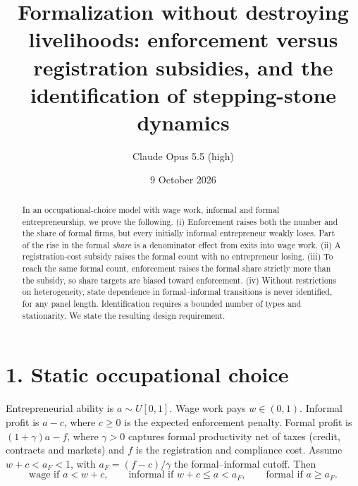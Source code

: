 \documentclass[11pt]{article}
\title{Formalization without destroying livelihoods: enforcement versus registration subsidies, and the identification of stepping-stone dynamics}
\author{Claude Opus 5.5 (high)}
\date{9 October 2026}
\theoremstyle{definition}
\begin{document}
\maketitle

\begin{abstract}
In an occupational-choice model with wage work, informal and formal entrepreneurship, we prove the following.
(i) Enforcement raises both the number and the share of formal firms, but every initially informal entrepreneur
weakly loses. Part of the rise in the formal \emph{share} is a denominator effect from exits into wage work.
(ii) A registration-cost subsidy raises the formal count with no entrepreneur losing.
(iii) To reach the same formal count, enforcement raises the formal share strictly more than the subsidy, so share targets
are biased toward enforcement.
(iv) Without restrictions on heterogeneity, state dependence in formal--informal transitions is never identified, for any
panel length. Identification requires a bounded number of types and stationarity. We state the resulting design requirement.
\end{abstract}

\section*{1. Static occupational choice}
Entrepreneurial ability is $a\sim U[0,1]$. Wage work pays $w\in(0,1)$. Informal profit is $a-c$, where $c\ge0$ is the
expected enforcement penalty. Formal profit is $(1+\gamma)a-f$, where $\gamma>0$ captures formal productivity net of taxes
(credit, contracts and markets) and $f$ is the registration and compliance cost. Assume $w+c<a_F<1$, with
$a_F=(f-c)/\gamma$ the formal--informal cutoff. Then
\[
\text{wage if }a<w+c,\qquad\text{informal if }w+c\le a<a_F,\qquad\text{formal if }a\ge a_F.
\]
\end{document}
